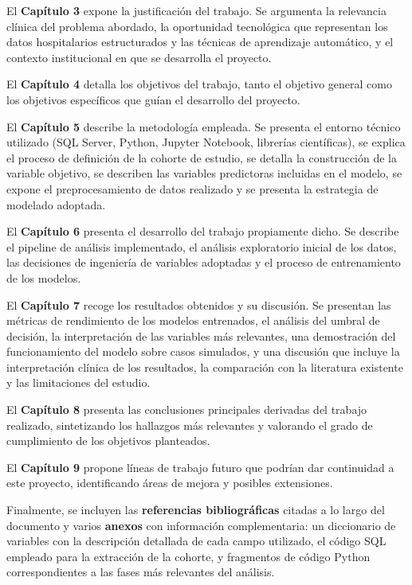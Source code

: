 \documentclass[12pt, a4paper, oneside]{report}
\begin{document}
El \textbf{Capítulo 3} expone la justificación del trabajo. Se argumenta la relevancia clínica del problema abordado, la oportunidad tecnológica que representan los datos hospitalarios estructurados y las técnicas de aprendizaje automático, y el contexto institucional en que se desarrolla el proyecto.

El \textbf{Capítulo 4} detalla los objetivos del trabajo, tanto el objetivo general como los objetivos específicos que guían el desarrollo del proyecto.

El \textbf{Capítulo 5} describe la metodología empleada. Se presenta el entorno técnico utilizado (SQL Server, Python, Jupyter Notebook, librerías científicas), se explica el proceso de definición de la cohorte de estudio, se detalla la construcción de la variable objetivo, se describen las variables predictoras incluidas en el modelo, se expone el preprocesamiento de datos realizado y se presenta la estrategia de modelado adoptada.

El \textbf{Capítulo 6} presenta el desarrollo del trabajo propiamente dicho. Se describe el pipeline de análisis implementado, el análisis exploratorio inicial de los datos, las decisiones de ingeniería de variables adoptadas y el proceso de entrenamiento de los modelos.

El \textbf{Capítulo 7} recoge los resultados obtenidos y su discusión. Se presentan las métricas de rendimiento de los modelos entrenados, el análisis del umbral de decisión, la interpretación de las variables más relevantes, una demostración del funcionamiento del modelo sobre casos simulados, y una discusión que incluye la interpretación clínica de los resultados, la comparación con la literatura existente y las limitaciones del estudio.

El \textbf{Capítulo 8} presenta las conclusiones principales derivadas del trabajo realizado, sintetizando los hallazgos más relevantes y valorando el grado de cumplimiento de los objetivos planteados.

El \textbf{Capítulo 9} propone líneas de trabajo futuro que podrían dar continuidad a este proyecto, identificando áreas de mejora y posibles extensiones.

Finalmente, se incluyen las \textbf{referencias bibliográficas} citadas a lo largo del documento y varios \textbf{anexos} con información complementaria: un diccionario de variables con la descripción detallada de cada campo utilizado, el código SQL empleado para la extracción de la cohorte, y fragmentos de código Python correspondientes a las fases más relevantes del análisis.
\end{document}
